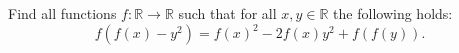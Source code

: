 Find all functions $f\colon\mathbb{R} \rightarrow \mathbb{R}$ such that
for all $x,y \in \mathbb{R}$ the following holds:
$$f(f(x)-y^2)=f(x)^2-2f(x)y^2+f(f(y)).$$